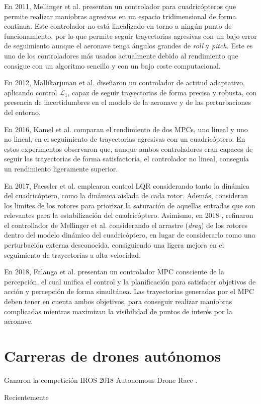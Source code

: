 En 2011, Mellinger et al. \cite{MinimunSnap2011} presentan un controlador para cuadricópteros que permite realizar maniobras agresivas en un espacio tridimensional de forma continua. Este controlador no está linealizado en torno a ningún punto de funcionamiento, por lo que permite seguir trayectorias agresivas con un bajo error de seguimiento aunque el aeronave tenga ángulos grandes de \textit{roll} y \textit{pitch}. Este es uno de los controladores más usados actualmente debido al rendimiento que consigue con un algoritmo sencillo y con un bajo coste computacional.

En 2012, Mallikarjunan et al. \cite{mallikarjunan2012l1} diseñaron un controlador de actitud adaptativo, aplicando control $\mathcal{L}_1$, capaz de seguir trayectorias de forma precisa y robusta, con presencia de incertidumbres en el modelo de la aeronave y de las perturbaciones del entorno.

En 2016, Kamel et al. \cite{KamelMPC2016} comparan el rendimiento de dos MPCs, uno lineal y uno no lineal, en el seguimiento de trayectorias agresivas con un cuadricóptero. En estos experimentos observaron que, aunque ambos controladores eran capaces de seguir las trayectorias de forma satisfactoria, el controlador no lineal, conseguía un rendimiento ligeramente superior.

En 2017, Faessler et al. \cite{Faessler17ral} emplearon control LQR considerando tanto la dinámica del cuadricóptero, como la dinámica aislada de cada rotor. Además, consideran los limites de los rotores para priorizar la saturación de aquellas entradas que son relevantes para la estabilización del cuadricóptero. Asimismo, en 2018 \cite{Faessler18ral}, refinaron el controllador de Mellinger et al. considerando el arrastre (\textit{drag}) de los rotores dentro del modelo dinámico del cuadricóptero, en lugar de considerarlo como una perturbación externa desconocida, consiguiendo una ligera mejora en el seguimiento de trayectorias a alta velocidad.
 
En 2018, Falanga et al. \cite{falanga2018pampc} presentan un controlador MPC consciente de la percepción, el cual unifica el control y la planificación para satisfacer objetivos de acción y percepción de forma simultánea. Las trayectorias generadas por el MPC deben tener en cuenta ambos objetivos, para conseguir realizar maniobras complicadas mientras maximizan la visibilidad de puntos de interés por la aeronave.


\section{Carreras de drones autónomos}
Ganaron la competición IROS 2018 Autonomous Drone Race \cite{BeautyAndTheBeast}.

Recientemente \cite{foehn2020alphapilot}




